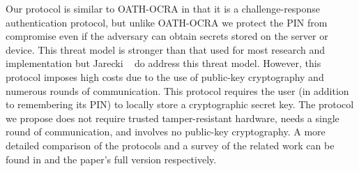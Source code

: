 Our protocol is similar to OATH-OCRA in that it is a challenge-response authentication protocol, but unlike OATH-OCRA we protect the PIN from compromise even if the adversary can obtain secrets stored on the server or device.
This threat model is stronger than that used for most research and implementation but Jarecki \etal~\cite{JareckiJKSS21} do address this threat model.
However, this protocol imposes high costs due to the use of public-key cryptography and numerous rounds of communication. 
This protocol requires the user (in addition to remembering its PIN) to locally store a cryptographic secret key. The protocol we propose does not require trusted tamper-resistant hardware, needs a single round of communication, and involves no public-key cryptography.
A more detailed comparison of the protocols and a survey of the related work can be found in  and the paper's full version \cite{full-version} respectively.


